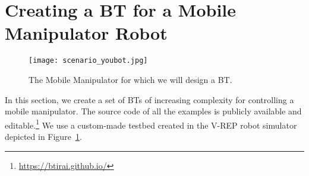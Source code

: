%
%
%
%

\section{Creating a BT for a Mobile Manipulator Robot}
\label{sec:youbot}
\begin{figure}[h]
\centering
\texttt{[image: scenario\_youbot.jpg]}
\caption{The Mobile Manipulator for which we will design a BT.}
\label{bts.fig.ScenarioYouBot}
\end{figure}

In this section, we create a set of BTs of increasing complexity for controlling a mobile manipulator.
The source code of all the examples is publicly available and editable.\footnote{\url{https://btirai.github.io/}}
We use a custom-made testbed created in the V-REP robot simulator depicted in Figure~\ref{bts.fig.ScenarioYouBot}. 


